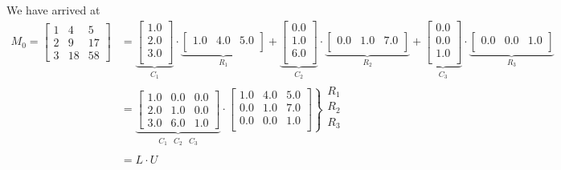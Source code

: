 We have arrived at 
\begin{align*}
M_0  =\left[\begin{array}{rrr} 
    1   &  4   &  5 \\
    2  &   9  &  17 \\
    3  &  18  &  58 \end{array}  \right] &=\underbrace{\left[
\begin{array}{c}
1.0 \\
2.0 \\
3.0 \\
\end{array}
\right]}_{C_1} \cdot \underbrace{\left[
\begin{array}{ccc}
1.0 & 4.0 & 5.0 \\
\end{array}
\right]}_{R_1} +  \underbrace{\left[
\begin{array}{c}
0.0 \\
1.0 \\
6.0 \\
\end{array}
\right]}_{C_2} \cdot \underbrace{\left[
\begin{array}{ccc}
0.0 & 1.0 & 7.0 \\
\end{array}
\right]}_{R_2}  + \underbrace{\left[
\begin{array}{c}
0.0 \\
0.0 \\
1.0 \\
\end{array}
\right]}_{C_3} \cdot \underbrace{\left[
\begin{array}{ccc}
0.0 & 0.0 & 1.0 \\
\end{array}
\right]}_{R_3} \\
& = \underbrace{\left[
\begin{array}{ccc}
1.0 & 0.0 & 0.0 \\
2.0 & 1.0 & 0.0 \\
3.0 & 6.0 & 1.0 
\end{array}
\right]}_{\begin{array}{ccc}
C_1 & C_2 & C_3 \\
\end{array}} \cdot \left. \left[
\begin{array}{ccc}
1.0 & 4.0 & 5.0 \\
0.0 & 1.0 & 7.0 \\
0.0 & 0.0 & 1.0 \\
\end{array}
\right]\right\} \begin{array}{c}
R_1 \\
R_2 \\
R_3 \\
\end{array} \\
& = L \cdot U
\end{align*} 

